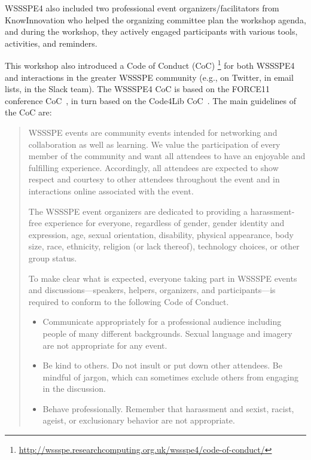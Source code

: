 \documentclass[11pt, oneside]{amsart}
\begin{document}
WSSSPE4 also included two professional event organizers/facilitators from
KnowInnovation who helped the organizing committee plan the workshop agenda,
and during the workshop, they actively engaged participants with various
tools, activities, and reminders.

This workshop also introduced a Code of Conduct (CoC)
\footnote{\url{http://wssspe.researchcomputing.org.uk/wssspe4/code-of-conduct/}}
for both WSSSPE4 and interactions in the greater WSSSPE community (e.g., on
Twitter, in email lists, in the Slack team). The WSSSPE4 CoC is based on the
FORCE11 conference CoC~\cite{FORCE11:CoC}, in turn based on the Code4Lib
CoC~\cite{Code4Lib:CoC}.
The main guidelines of the CoC are:
\begin{quote}
    WSSSPE events are community events intended for networking and collaboration
    as well as learning. We value the participation of every member of the
    community and want all attendees to have an enjoyable and fulfilling
    experience. Accordingly, all attendees are expected to show respect and
    courtesy to other attendees throughout the event and in interactions online
    associated with the event.

    The WSSSPE event organizers are dedicated to providing a harassment-free
    experience for everyone, regardless of gender, gender identity and
    expression, age, sexual orientation, disability, physical appearance,
    body size, race, ethnicity, religion (or lack thereof), technology choices,
    or other group status.

    To make clear what is expected, everyone taking part in WSSSPE events and
    discussions---speakers, helpers, organizers, and participants---is required
    to conform to the following Code of Conduct.

    \begin{itemize}
    \item Communicate appropriately for a professional audience including
    people of many different backgrounds. Sexual language and imagery are not
    appropriate for any event.

    \item Be kind to others. Do not insult or put down other attendees. Be
    mindful of jargon, which can sometimes exclude others from engaging in the
    discussion.

    \item Behave professionally. Remember that harassment and sexist, racist,
    ageist, or exclusionary behavior are not appropriate.
    \end{itemize}
\end{quote}
\end{document}
